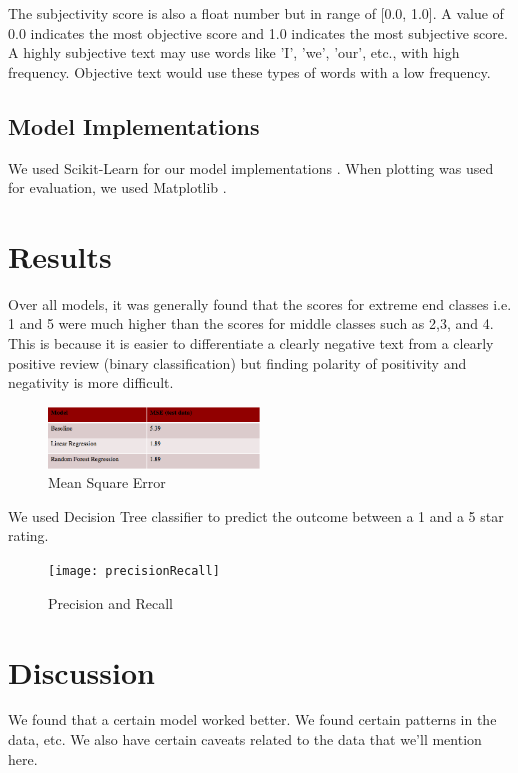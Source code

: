 \documentclass[12pt]{article}
\begin{document}
The subjectivity score is also a float number but in range of [0.0, 1.0]. A value of 0.0
indicates the most objective score and 1.0 indicates the most subjective score. A highly
subjective text may use words like 'I', 'we', 'our', etc., with high frequency. Objective
text would use these types of words with a low frequency.

\subsection{Model Implementations}

We used Scikit-Learn for our model implementations \cite{sklearnl76:online, 32432skl20:online,
  sklearnt25:online}. When plotting was used for evaluation, we used
Matplotlib \cite{Matplotl1:online}. 

\section{Results}

Over all models, it was generally found that the scores for extreme end classes i.e. 1 and 5 
were much higher than the scores for middle classes such as 2,3, and 4. This is because it is 
easier to differentiate a clearly negative text from a clearly positive review (binary classification)
but finding polarity of positivity and negativity is more difficult.

\begin{figure}[h]
  \caption{Mean Square Error}
  \centering
  \includegraphics[width=0.5\textwidth]{MSE}
  \end{figure}
  
  We used Decision Tree classifier to predict the outcome between a 1 and a 5 star rating.
  
  \begin{figure}[h]
  \caption{Precision and Recall }
  \centering
  \texttt{[image: precisionRecall]}
  \end{figure}


\section{Discussion}

We found that a certain model worked better. We found certain patterns
in the data, etc. We also have certain caveats related to the data that
we'll mention here.
\end{document}
